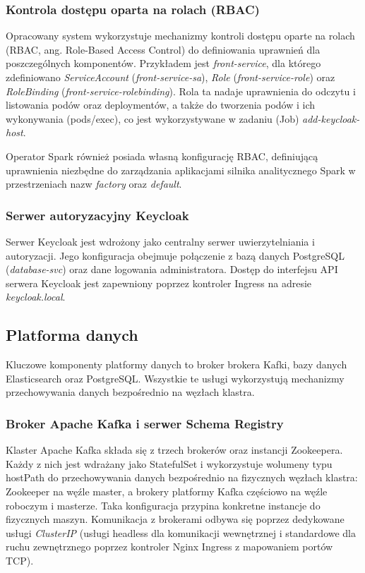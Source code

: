 \subsubsection{Kontrola dostępu oparta na rolach (RBAC)}
\label{subsubsec:RBAC}
Opracowany system wykorzystuje mechanizmy kontroli dostępu oparte na rolach (RBAC, ang. Role-Based Access Control) do definiowania uprawnień dla poszczególnych komponentów. Przykładem jest \textit{front-service}, dla którego zdefiniowano \textit{ServiceAccount} (\textit{front-service-sa}), \textit{Role} (\textit{front-service-role}) oraz \textit{RoleBinding} (\textit{front-service-rolebinding}). Rola ta nadaje uprawnienia do odczytu i listowania podów oraz deploymentów, a także do tworzenia podów i ich wykonywania (pods/exec), co jest wykorzystywane w zadaniu (Job) \textit{add-keycloak-host}.

Operator Spark również posiada własną konfigurację RBAC, definiującą uprawnienia niezbędne do zarządzania aplikacjami silnika analitycznego Spark w przestrzeniach nazw \textit{factory} oraz \textit{default}.

\subsubsection{Serwer autoryzacyjny Keycloak}
Serwer Keycloak jest wdrożony jako centralny serwer uwierzytelniania i autoryzacji. Jego konfiguracja obejmuje połączenie z bazą danych PostgreSQL (\textit{database-svc}) oraz dane logowania administratora. Dostęp do interfejsu API serwera Keycloak jest zapewniony poprzez kontroler Ingress na adresie \textit{keycloak.local}.

\subsection{Platforma danych}

Kluczowe komponenty platformy danych to broker brokera Kafki, bazy danych Elasticsearch oraz PostgreSQL. Wszystkie te usługi wykorzystują mechanizmy przechowywania danych bezpośrednio na węzłach klastra.

\subsubsection{Broker Apache Kafka i serwer Schema Registry}
Klaster Apache Kafka składa się z trzech brokerów oraz instancji Zookeepera. Każdy z nich jest wdrażany jako StatefulSet i wykorzystuje wolumeny typu hostPath do przechowywania danych bezpośrednio na fizycznych węzłach klastra: Zookeeper na węźle master, a brokery platformy Kafka częściowo na węźle roboczym i masterze. Taka konfiguracja przypina konkretne instancje do fizycznych maszyn. Komunikacja z brokerami odbywa się poprzez dedykowane usługi \textit{\mbox{ClusterIP}} (usługi headless dla komunikacji wewnętrznej i standardowe dla ruchu zewnętrznego poprzez kontroler Nginx Ingress z mapowaniem portów TCP).

